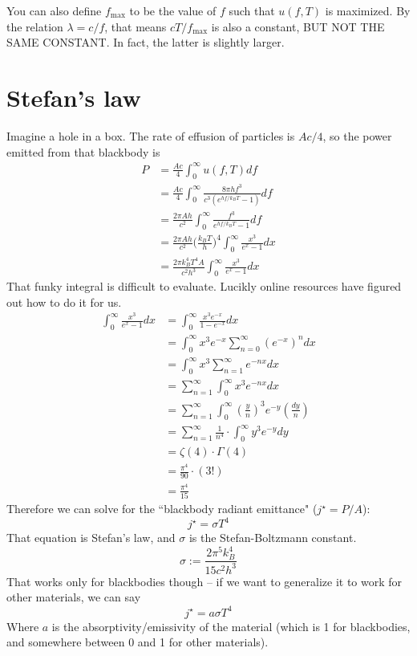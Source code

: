 \documentclass[12pt]{article}
\begin{document}
You can also define $f_\text{max}$ to be the value of $f$ such that $u(f, T)$ is maximized. By the relation $\lambda = c / f$, that means $c T / f_\text{max}$ is also a constant, BUT NOT THE SAME CONSTANT. In fact, the latter is slightly larger.

\section{Stefan's law}
Imagine a hole in a box. The rate of effusion of particles is $A c / 4$, so the power emitted from that blackbody is
\begin{align*}
    P &= \frac{A c}{4} \int_0^\infty u(f, T) df \\
      &= \frac{A c}{4} \int_0^\infty \frac{8 \pi h f^3}{c^3 (e^{hf/k_B T} - 1)}  df \\
      &= \frac{2 \pi A h}{c^2} \int_0^\infty \frac{f^3}{e^{hf/k_B T} - 1} df \\
      &= \frac{2 \pi A h}{c^2} \Bigg( \frac{k_B T}{h} \Bigg)^4 \int_0^\infty \frac{x^3}{e^x - 1} dx \\
      &= \frac{2 \pi k_B^4 T^4 A}{c^2 h^3} \int_0^\infty \frac{x^3}{e^x - 1} dx
\end{align*}
That funky integral is difficult to evaluate. Lucikly online resources have figured out how to do it for us.
\begin{align*}
    \int_0^\infty \frac{x^3}{e^x - 1} dx &= \int_0^\infty \frac{x^3 e^{-x}}{1 - e^{-x}} dx \\
    &= \int_0^\infty x^3 e^{-x} \sum_{n=0}^\infty (e^{-x})^n dx \\
    &= \int_0^\infty x^3 \sum_{n=1}^\infty e^{-nx} dx \\
    &= \sum_{n=1}^\infty \int_0^\infty x^3 e^{-nx} dx \\
    &= \sum_{n=1}^\infty \int_0^\infty \left( \frac{y}{n} \right)^3 e^{-y} \left( \frac{dy}{n} \right) \\
    &= \sum_{n=1}^\infty \frac{1}{n^4} \cdot \int_0^\infty y^3 e^{-y} dy \\
    &= \zeta(4) \cdot \Gamma(4) \\
    &= \frac{\pi^4}{90} \cdot (3!) \\
    &= \frac{\pi^4}{15}
\end{align*}
Therefore we can solve for the ``blackbody radiant emittance" ($j^\star = P / A$):
\[ j^\star = \sigma T^4 \]
That equation is Stefan's law, and $\sigma$ is the Stefan-Boltzmann constant.
\[ \sigma := \frac{2 \pi^5 k_B^4}{15 c^2 h^3} \]
That works only for blackbodies though -- if we want to generalize it to work for other materials, we can say
\[ j^\star = a \sigma T^4 \]
Where $a$ is the absorptivity/emissivity of the material (which is 1 for blackbodies, and somewhere between 0 and 1 for other materials).
\end{document}
